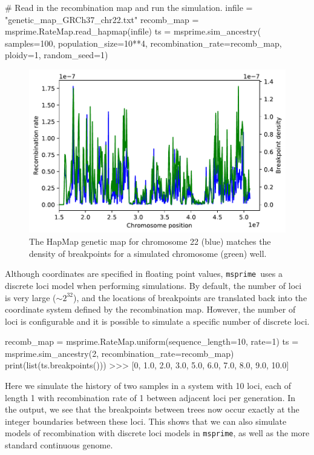\documentclass[graybox]{svmult}
\newcommand{\msprime}[0]{\texttt{msprime}}
\begin{document}
\begin{pythoncode}
# Read in the recombination map and run the simulation.
infile = "genetic_map_GRCh37_chr22.txt"
recomb_map = msprime.RateMap.read_hapmap(infile)
ts = msprime.sim_ancestry(
    samples=100,
    population_size=10**4,
    recombination_rate=recomb_map,
    ploidy=1,
    random_seed=1)
\end{pythoncode}

\begin{figure}
\begin{center}
\includegraphics[width=\textwidth]{images/plot_11.pdf}
\end{center}
\caption{\label{fig:variable_recombination} The HapMap
genetic map for chromosome 22 (blue) matches the density of breakpoints for a simulated chromosome (green) well.}
\end{figure}

Although coordinates are specified in floating point values, \msprime\
uses a discrete loci model when performing simulations. By default, the
number of loci is very large (\(\sim 2^{32}\)), and the locations of
breakpoints are translated back into the coordinate system defined by
the recombination map. However, the number of loci is configurable and
it is possible to simulate a specific number of discrete
loci.

\begin{pythoncode}
recomb_map = msprime.RateMap.uniform(sequence_length=10, rate=1)
ts = msprime.sim_ancestry(2, recombination_rate=recomb_map)
print(list(ts.breakpoints()))
>>> [0, 1.0, 2.0, 3.0, 5.0, 6.0, 7.0, 8.0, 9.0, 10.0]
\end{pythoncode}

    Here we simulate the history of two samples in a system with 10 loci, each of
length 1 with recombination rate of 1 between adjacent loci per
generation. In the output, we see that the breakpoints between trees now
occur exactly at the integer boundaries between these loci. This shows that
we can also simulate models of recombination with discrete loci models
in \msprime, as well as the more standard continuous genome.
\end{document}
